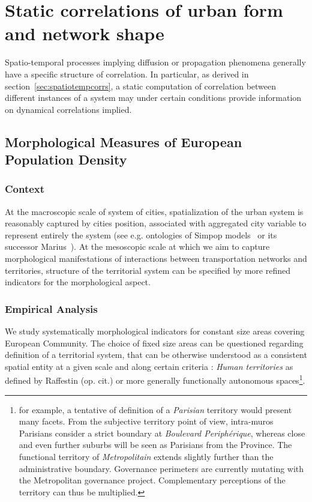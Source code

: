 
\newpage

\section{Static correlations of urban form and network shape}


Spatio-temporal processes implying diffusion or propagation phenomena generally have a specific structure of correlation. In particular, as derived in section~\ref{sec:spatiotempcorrs}, a static computation of correlation between different instances of a system may under certain conditions provide information on dynamical correlations implied.




\subsection{Morphological Measures of European Population Density}

\subsubsection{Context}

At the macroscopic scale of system of cities, spatialization of the urban system is reasonably captured by cities position, associated with aggregated city variable to represent entirely the system (see e.g. ontologies of Simpop models~\cite{pumain2012multi} or its successor Marius~\cite{cottineau2014evolution}). At the mesoscopic scale at which we aim to capture morphological manifestations of interactions between transportation networks and territories, structure of the territorial system can be specified by more refined indicators for the morphological aspect. 

\subsubsection{Empirical Analysis}

We study systematically morphological indicators for constant size areas covering European Community. The choice of fixed size areas can be questioned regarding definition of a territorial system, that can be otherwise understood as a consistent spatial entity at a given scale and along certain criteria : \emph{Human territories} as defined by Raffestin (op. cit.) or more generally functionally autonomous spaces\footnote{for example, a tentative of definition of a \textit{Parisian} territory would present many facets. From the subjective territory point of view, intra-muros Parisians consider a strict boundary at \textit{Boulevard Periph{\'e}rique}, whereas close and even further suburbs will be seen as Parisians from the Province. The functional territory of \textit{Metropolitain} extends slightly further than the administrative boundary. Governance perimeters are currently mutating with the Metropolitan governance project. Complementary perceptions of the territory can thus be multiplied.}.





